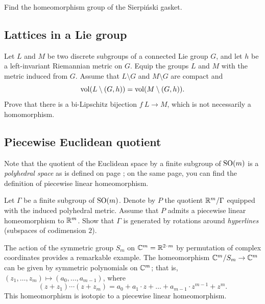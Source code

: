 \begin{pr} 
Find the homeomorphism group of the Sierpi\'nski gasket.
\end{pr}



\subsection*{Lattices in a Lie group}\label{Boys and girls in a Lie group}

\begin{pr}
Let $L$ and $M$ be two discrete subgroups of a connected Lie group $G$,
and let $h$ be a left-invariant Riemannian metric on $G$.
Equip the groups $L$ and $M$ 
with the metric induced from $G$.
Assume that $L\setminus G$ and $M\setminus G$ are compact and
$$\operatorname{\rm vol}\nolimits(L\setminus (G,h))
=
\operatorname{\rm vol}\nolimits(M\setminus (G,h)).$$
Prove that there is a bi-Lipschitz bijection $f\:L
\to
M$, which is not necessarily a homomorphism.
\end{pr}


\subsection*{Piecewise Euclidean quotient}\label{Piecewise Euclidean quotient}

Note that the quotient of the Euclidean space by a finite subgroup of $\mathrm{SO}(m)$ is a {}\emph{polyhedral space} as is defined on page \pageref{piecewise linear map};
on the same page, you can find the definition of piecewise linear homeomorphism.


\begin{pr}
Let $\Gamma$ be a finite subgroup of $\mathrm{SO}(m)$.
Denote by $P$ the quotient $\mathbb{R}^m/\Gamma$ equipped with the induced
polyhedral metric.
Assume that $P$ admits a piecewise linear homeomorphism to $\mathbb{R}^m$.
Show that $\Gamma$ is generated by rotations around \emph{hyperlines} (subspaces of codimension $2$).
\end{pr}

The action of the symmetric group $S_m$ on $\CC^m=\RR^{2\cdot m}$ by permutation of complex coordinates provides a remarkable example.
The homeomorphism $\mathbb{C}^m/S_m\to \mathbb{C}^m$ can be given by symmetric polynomials on $\mathbb{C}^m$;
that is, $(z_1,\ldots,z_m)\mapsto (a_0,\ldots,a_{m-1})$, where
\[(z+z_1)\cdots(z+z_m)=a_0+a_1\cdot z+\ldots+a_{m-1}\cdot z^{m-1}+z^m.\]
This homeomorphism is isotopic to a piecewise linear homeomorphism.

